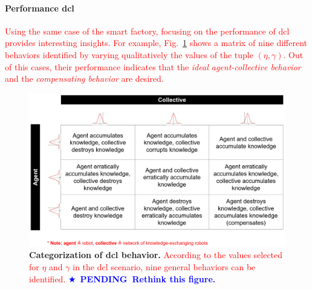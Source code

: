 \documentclass[12pt]{article}
\newcommand\myhl[1]{\textcolor{red}{#1}}
\renewcommand{\emph}[1]{\textit{#1}}
\newcommand*{\pending}[1]{\textcolor{blue}{$\bigstar$~\textbf{PENDING~#1}}}
\begin{document}
\paragraph*{Performance \acl{dcl}}
\myhl{Using the same case of the smart factory, focusing on the performance of \ac{dcl} provides interesting insights. For example, Fig.~\ref{fig:dcl_categories_matrix_tmp} shows a matrix of nine different behaviors identified by varying qualitatively the values of the tuple $(\eta,\gamma)$. Out of this cases, their performance indicates that the \emph{ideal agent-collective behavior} and the \emph{compensating behavior} are desired.}
\begin{figure}[t!]
	\centering
	\hspace*{\fill}
	\includegraphics[width=14cm]{dcl_categories_matrix_tmp.png}
	\hspace*{\fill}
	\caption[] {\label{fig:dcl_categories_matrix_tmp} \textbf{Categorization of \ac{dcl} behavior.} \myhl{According to the values selected for $\eta$ and $\gamma$ in the \acl{dcl} scenario, nine general behaviors can be identified.} \pending{Rethink this figure.}}
\end{figure}

\end{document}
